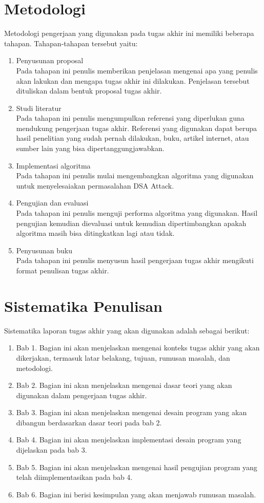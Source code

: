 \section {Metodologi}

Metodologi pengerjaan yang digunakan pada tugas akhir ini memiliki beberapa tahapan. Tahapan-tahapan tersebut yaitu:

\begin{enumerate}
\item Penyusunan proposal\\
Pada tahapan ini penulis memberikan penjelasan mengenai apa yang penulis akan lakukan dan mengapa tugas akhir ini dilakukan. Penjelasan tersebut dituliskan dalam bentuk proposal tugas akhir.
\item Studi literatur\\
Pada tahapan ini penulis mengumpulkan referensi yang diperlukan guna mendukung pengerjaan tugas akhir. Referensi yang digunakan dapat berupa hasil penelitian yang sudah pernah dilakukan, buku, artikel internet, atau sumber lain yang bisa dipertanggungjawabkan.
\item Implementasi algoritma\\
Pada tahapan ini penulis mulai mengembangkan algoritma yang digunakan untuk menyelesaiakan permasalahan DSA Attack.
\item Pengujian dan evaluasi\\
Pada tahapan ini penulis menguji performa algoritma yang digunakan. Hasil pengujian kemudian dievaluasi untuk kemudian dipertimbangkan apakah algoritma masih bisa ditingkatkan lagi atau tidak.
\item Penyusunan buku\\
Pada tahapan ini penulis menyusun hasil pengerjaan tugas akhir mengikuti format penulisan tugas akhir.
\end{enumerate}

\section {Sistematika Penulisan}

Sistematika laporan tugas akhir yang akan digunakan adalah sebagai berikut:

\begin{enumerate}
\item Bab 1. Bagian ini akan menjelaskan mengenai konteks tugas akhir yang akan dikerjakan, termasuk latar belakang, tujuan, rumusan masalah, dan metodologi.
\item Bab 2. Bagian ini akan menjelaskan mengenai dasar teori yang akan digunakan dalam pengerjaan tugas akhir.
\item Bab 3. Bagian ini akan menjelaskan mengenai desain program yang akan dibangun berdasarkan dasar teori pada bab 2.
\item Bab 4. Bagian ini akan menjelaskan implementasi desain program yang dijelaskan pada bab 3.
\item Bab 5. Bagian ini akan menjelaskan mengenai hasil pengujian program yang telah diimplementasikan pada bab 4.
\item Bab 6. Bagian ini berisi kesimpulan yang akan menjawab rumusan masalah.
\end{enumerate}